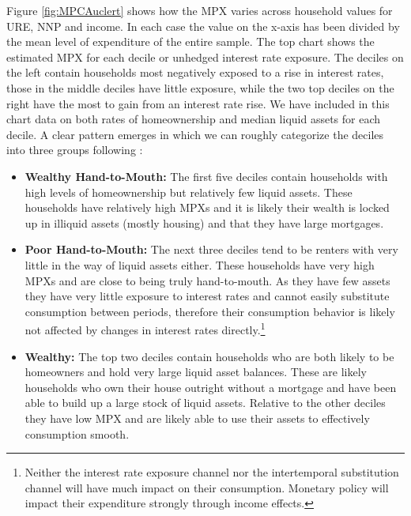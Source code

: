 \documentclass[titlepage]{\econtex}\newcommand{\texname}{ConsumptionHeterogeneity}
\begin{document}
Figure \ref{fig:MPCAuclert} shows how the MPX varies across household values for URE, NNP and income. In each case the value on the x-axis has been divided by the mean level of expenditure of the entire sample. The top chart shows the estimated MPX for each decile or unhedged interest rate exposure. The deciles on the left contain households most negatively exposed to a rise in interest rates, those in the middle deciles have little exposure, while the two top deciles on the right have the most to gain from an interest rate rise. We have included in this chart data on both rates of homeownership and median liquid assets for each decile. A clear pattern emerges in which we can roughly categorize the deciles into three groups following \cite{violante_wealthy_2014}:
\begin{itemize}
	\item \textbf{Wealthy Hand-to-Mouth:} The first five deciles contain households with high levels of homeownership but relatively few liquid assets. These households have relatively high MPXs and it is likely their wealth is locked up in illiquid assets (mostly housing) and that they have large mortgages.
	\item \textbf{Poor Hand-to-Mouth:} The next three deciles tend to be renters with very little in the way of liquid assets either. These households have very high MPXs and are close to being truly hand-to-mouth. As they have few assets they have very little exposure to interest rates and cannot easily substitute consumption between periods, therefore their consumption behavior is likely not affected by changes in interest rates directly.\footnote{Neither the interest rate exposure channel nor the intertemporal substitution channel will have much impact on their consumption. Monetary policy will impact their expenditure strongly through income effects.}
	\item \textbf{Wealthy:} The top two deciles contain households who are both likely to be homeowners and hold very large liquid asset balances. These are likely households who own their house outright without a mortgage and have been able to build up a large stock of liquid assets. Relative to the other deciles they have low MPX and are likely able to use their assets to effectively consumption smooth.
\end{itemize}
\end{document}

